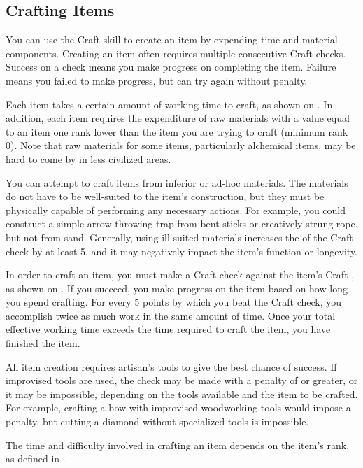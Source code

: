   \subsection{Crafting Items}\label{Crafting Items}
    You can use the Craft skill to create an item by expending time and material components. Creating an item often requires multiple consecutive Craft checks. Success on a check means you make progress on completing the item. Failure means you failed to make progress, but can try again without penalty.

    Each item takes a certain amount of working time to craft, as shown on .
    In addition, each item requires the expenditure of raw materials with a value equal to an item one rank lower than the item you are trying to craft (minimum rank 0).
    Note that raw materials for some items, particularly alchemical items, may be hard to come by in less civilized areas.

    You can attempt to craft items from inferior or ad-hoc materials.
    The materials do not have to be well-suited to the item's construction, but they must be physically capable of performing any necessary actions.
    For example, you could construct a simple arrow-throwing trap from bent sticks or creatively strung rope, but not from sand.
    Generally, using ill-suited materials increases the  of the Craft check by at least 5, and it may negatively impact the item's function or longevity.

    In order to craft an item, you must make a Craft check against the item's Craft , as shown on .
    If you succeed, you make progress on the item based on how long you spend crafting.
    For every 5 points by which you beat the Craft check, you accomplish twice as much work in the same amount of time.
    Once your total effective working time exceeds the time required to craft the item, you have finished the item.

    All item creation requires artisan's tools to give the best chance of success. If improvised tools are used, the check may be made with a penalty of  or greater, or it may be impossible, depending on the tools available and the item to be crafted. For example, crafting a bow with improvised woodworking tools would impose a  penalty, but cutting a diamond without specialized tools is impossible.

    The time and difficulty involved in crafting an item depends on the item's rank, as defined in .

